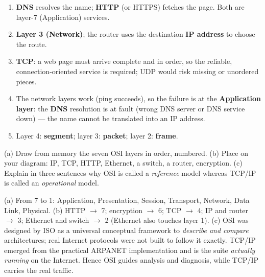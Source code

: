 \documentclass[11pt]{article}
\begin{document}
\begin{corrige}[Exercise 1]
\begin{enumerate}
\item \textbf{DNS} resolves the name; \textbf{HTTP} (or HTTPS) fetches the page. Both are layer-7 (Application) services.
\item \textbf{Layer 3 (Network)}; the router uses the destination \textbf{IP address} to choose the route.
\item \textbf{TCP}: a web page must arrive complete and in order, so the reliable, connection-oriented service is required; UDP would risk missing or unordered pieces.
\item The network layers work (ping succeeds), so the failure is at the \textbf{Application layer}: the \textbf{DNS} resolution is at fault (wrong DNS server or DNS service down) — the name cannot be translated into an IP address.
\item Layer 4: \textbf{segment}; layer 3: \textbf{packet}; layer 2: \textbf{frame}.
\end{enumerate}
\end{corrige}

\begin{exercice}[Synthesis]
(a) Draw from memory the seven OSI layers in order, numbered. (b) Place on your diagram: IP, TCP, HTTP, Ethernet, a switch, a router, encryption. (c) Explain in three sentences why OSI is called a \emph{reference} model whereas TCP/IP is called an \emph{operational} model.
\end{exercice}

\begin{corrige}[Exercise 2]
(a) From 7 to 1: Application, Presentation, Session, Transport, Network, Data Link, Physical. (b) HTTP $\rightarrow$ 7; encryption $\rightarrow$ 6; TCP $\rightarrow$ 4; IP and router $\rightarrow$ 3; Ethernet and switch $\rightarrow$ 2 (Ethernet also touches layer 1). (c) OSI was designed by ISO as a universal conceptual framework to \emph{describe and compare} architectures; real Internet protocols were not built to follow it exactly. TCP/IP emerged from the practical ARPANET implementation and is the suite \emph{actually running} on the Internet. Hence OSI guides analysis and diagnosis, while TCP/IP carries the real traffic.
\end{corrige}
\end{document}
